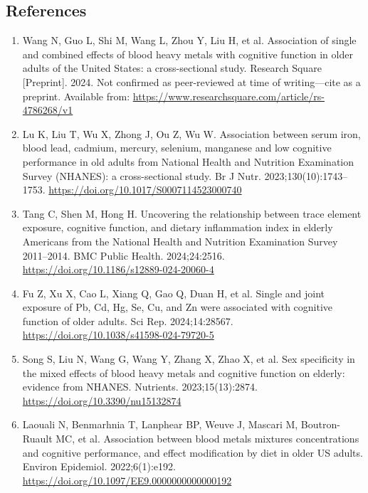 \documentclass[12pt]{article}
\begin{document}
\clearpage
\begin{singlespace}
\section*{References}

\begin{enumerate}
\item Wang N, Guo L, Shi M, Wang L, Zhou Y, Liu H, et al. Association of single and combined effects of blood heavy metals with cognitive function in older adults of the United States: a cross-sectional study. Research Square [Preprint]. 2024. Not confirmed as peer-reviewed at time of writing---cite as a preprint. Available from: \url{https://www.researchsquare.com/article/rs-4786268/v1}

\item Lu K, Liu T, Wu X, Zhong J, Ou Z, Wu W. Association between serum iron, blood lead, cadmium, mercury, selenium, manganese and low cognitive performance in old adults from National Health and Nutrition Examination Survey (NHANES): a cross-sectional study. Br J Nutr. 2023;130(10):1743--1753. \url{https://doi.org/10.1017/S0007114523000740}

\item Tang C, Shen M, Hong H. Uncovering the relationship between trace element exposure, cognitive function, and dietary inflammation index in elderly Americans from the National Health and Nutrition Examination Survey 2011--2014. BMC Public Health. 2024;24:2516. \url{https://doi.org/10.1186/s12889-024-20060-4}

\item Fu Z, Xu X, Cao L, Xiang Q, Gao Q, Duan H, et al. Single and joint exposure of Pb, Cd, Hg, Se, Cu, and Zn were associated with cognitive function of older adults. Sci Rep. 2024;14:28567. \url{https://doi.org/10.1038/s41598-024-79720-5}

\item Song S, Liu N, Wang G, Wang Y, Zhang X, Zhao X, et al. Sex specificity in the mixed effects of blood heavy metals and cognitive function on elderly: evidence from NHANES. Nutrients. 2023;15(13):2874. \url{https://doi.org/10.3390/nu15132874}

\item Laouali N, Benmarhnia T, Lanphear BP, Weuve J, Mascari M, Boutron-Ruault MC, et al. Association between blood metals mixtures concentrations and cognitive performance, and effect modification by diet in older US adults. Environ Epidemiol. 2022;6(1):e192. \url{https://doi.org/10.1097/EE9.0000000000000192}


\end{enumerate}
\end{singlespace}
\end{document}
